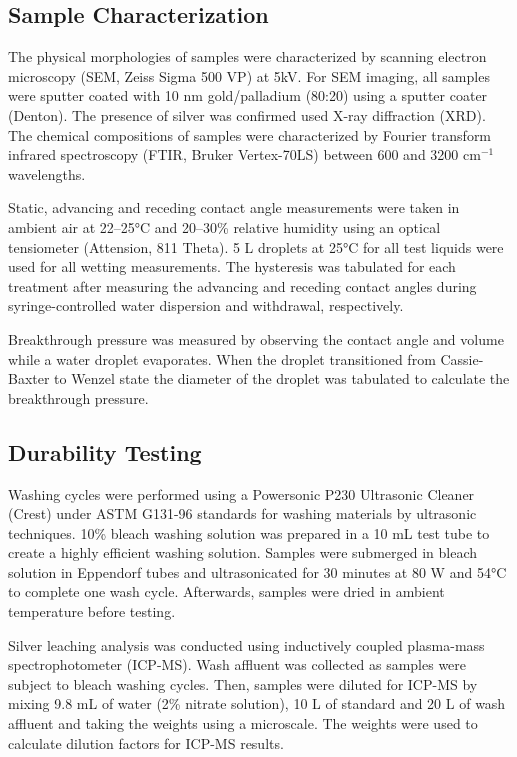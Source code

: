\documentclass[journal=jacsat,manuscript=article]{achemso}
\begin{document}
\subsection{Sample Characterization}
The physical morphologies of samples were characterized by scanning electron microscopy (SEM, Zeiss Sigma 500 VP) at 5kV. For SEM imaging, all samples were sputter coated with 10 nm gold/palladium (80:20) using a sputter coater (Denton). The presence of silver was confirmed used X-ray diffraction (XRD). The chemical compositions of samples were characterized by Fourier transform infrared spectroscopy (FTIR, Bruker Vertex-70LS) between 600 and 3200 cm$^{-1}$ wavelengths. 

Static, advancing and receding contact angle measurements were taken in ambient air at 22–25°C and 20–30\% relative humidity using an optical tensiometer (Attension, 811 Theta). 5 \micro L droplets at 25°C for all test liquids were used for all wetting measurements. The hysteresis was tabulated for each treatment after measuring the advancing and receding contact angles during syringe-controlled water dispersion and withdrawal, respectively.

Breakthrough pressure was measured by observing the contact angle and volume while a water droplet evaporates. When the droplet transitioned from Cassie-Baxter to Wenzel state the diameter of the droplet was tabulated to calculate the breakthrough pressure.



\subsection{Durability Testing}


Washing cycles were performed using a Powersonic P230 Ultrasonic Cleaner (Crest) under ASTM G131-96 standards for washing materials by ultrasonic techniques. 10\% bleach washing solution was prepared in a 10 mL test tube to create a highly efficient washing solution. Samples were submerged in bleach solution in Eppendorf tubes and ultrasonicated for 30 minutes at 80 W and 54°C to complete one wash cycle. Afterwards, samples were dried in ambient temperature before testing.

Silver leaching analysis was conducted using inductively coupled plasma-mass spectrophotometer (ICP-MS). Wash affluent was collected as samples were subject to bleach washing cycles. Then, samples were diluted for ICP-MS by mixing 9.8 mL of water (2\% nitrate solution), 10 \micro L of standard and 20 \micro L of wash affluent and taking the weights using a microscale. The weights were used to calculate dilution factors for ICP-MS results. 
\end{document}
